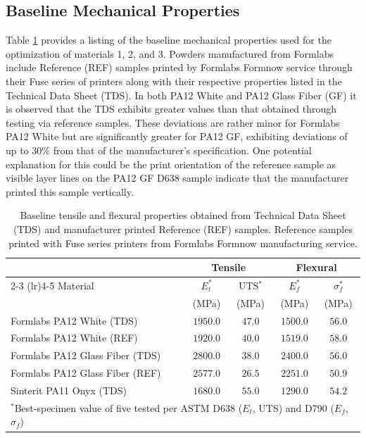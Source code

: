 \subsection{Baseline Mechanical Properties}

Table \ref{tab:agentic-sls-materials-baseline} provides a listing of the
baseline mechanical properties used for the optimization of materials 1, 2, and
3. Powders manufactured from Formlabs include Reference (REF) samples printed by
Formlabs Formnow service through their Fuse series of printers along with their
respective properties listed in the Technical Data Sheet (TDS). In both PA12
White and PA12 Glass Fiber (GF) it is observed that the TDS exhibits greater
values than that obtained through testing via reference samples. These
deviations are rather minor for Formlabs PA12 White but are significantly
greater for PA12 GF, exhibiting deviations of up to 30\% from that of the
manufacturer's specification. One potential explanation for this could be the
print orientation of the reference sample as visible layer lines on the PA12 GF
D638 sample indicate that the manufacturer printed this sample vertically.

\begin{table}[t]
  \centering
  \begin{tabular}{lcccc}
    \toprule
    & \multicolumn{2}{c}{Tensile} & \multicolumn{2}{c}{Flexural} \\
    \cmidrule(lr){2-3} \cmidrule(lr){4-5}
    Material & $E_t^{*}$ & UTS$^{*}$ & $E_f^{*}$ & $\sigma_f^{*}$ \\
    & (MPa) & (MPa) & (MPa) & (MPa) \\
    \midrule
    Formlabs PA12 White (TDS)           & $\bm{1950.0}$ & $\bm{47.0}$ & $1500.0$ & $56.0$ \\
    Formlabs PA12 White (REF)           & $1920.0$ & $40.0$ & $\bm{1519.0}$ & $\bm{58.0}$ \\
    \midrule
    Formlabs PA12 Glass Fiber (TDS)     & $\bm{2800.0}$ & $\bm{38.0}$ & $\bm{2400.0}$ & $\bm{56.0}$ \\
    Formlabs PA12 Glass Fiber (REF)     & $2577.0$ & $26.5$ & $2251.0$ & $50.9$ \\
    \midrule
    Sinterit PA11 Onyx (TDS)            & $\bm{1680.0}$ & $\bm{55.0}$ & $\bm{1290.0}$ & $\bm{54.2}$ \\
    \bottomrule
    \multicolumn{5}{l}{\footnotesize $^{*}$Best-specimen value of five tested
      per ASTM D638 (\(E_t\), UTS) and D790 (\(E_f\), \(\sigma_f\))} \\
  \end{tabular}
  \caption{
    Baseline tensile and flexural properties obtained from Technical Data Sheet
    (TDS) and manufacturer printed Reference (REF) samples. Reference samples
    printed with Fuse series printers from Formlabs Formnow manufacturing
    service.
  }
  \label{tab:agentic-sls-materials-baseline}
\end{table}

